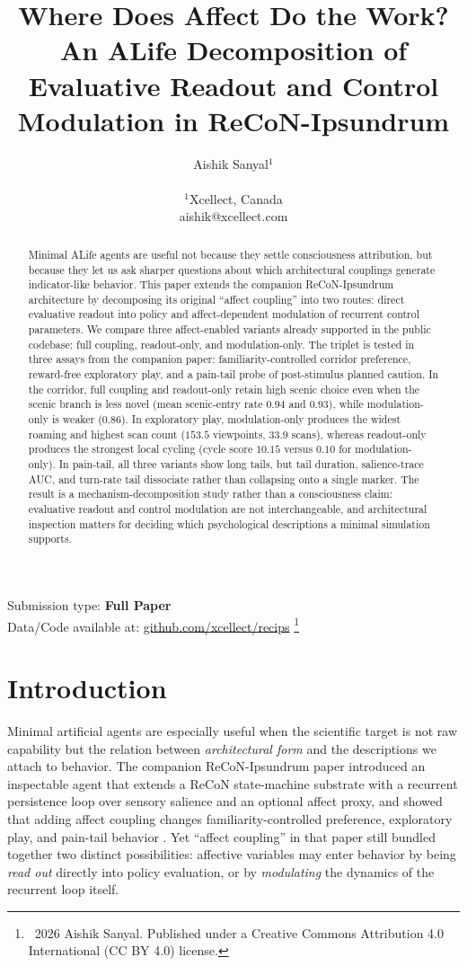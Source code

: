 \documentclass[letterpaper]{article}
\title{Where Does Affect Do the Work?\\
An ALife Decomposition of Evaluative Readout and Control Modulation in ReCoN-Ipsundrum}
\author{
    Aishik Sanyal$^{1}$ \\
    \mbox{}\\
    $^{1}$Xcellect, Canada \\
    aishik@xcellect.com
}
\newcommand\blfootnote[1]{%
  \begingroup
  \renewcommand\thefootnote{}\footnote{#1}%
  \addtocounter{footnote}{-1}%
  \endgroup
}
\begin{document}
\maketitle

\begin{abstract}
Minimal ALife agents are useful not because they settle consciousness attribution, but because they let us ask sharper questions about which architectural couplings generate indicator-like behavior. This paper extends the companion ReCoN-Ipsundrum architecture by decomposing its original ``affect coupling'' into two routes: direct evaluative readout into policy and affect-dependent modulation of recurrent control parameters. We compare three affect-enabled variants already supported in the public codebase: full coupling, readout-only, and modulation-only. The triplet is tested in three assays from the companion paper: familiarity-controlled corridor preference, reward-free exploratory play, and a pain-tail probe of post-stimulus planned caution. In the corridor, full coupling and readout-only retain high scenic choice even when the scenic branch is less novel (mean scenic-entry rate $0.94$ and $0.93$), while modulation-only is weaker ($0.86$). In exploratory play, modulation-only produces the widest roaming and highest scan count ($153.5$ viewpoints, $33.9$ scans), whereas readout-only produces the strongest local cycling (cycle score $10.15$ versus $0.10$ for modulation-only). In pain-tail, all three variants show long tails, but tail duration, salience-trace AUC, and turn-rate tail dissociate rather than collapsing onto a single marker. The result is a mechanism-decomposition study rather than a consciousness claim: evaluative readout and control modulation are not interchangeable, and architectural inspection matters for deciding which psychological descriptions a minimal simulation supports.
\end{abstract}

Submission type: \textbf{Full Paper}\\
Data/Code available at: \href{https://github.com/xcellect/recips}{github.com/xcellect/recips}
\blfootnote{\textcopyright~2026 Aishik Sanyal. Published under a Creative Commons Attribution 4.0 International (CC BY 4.0) license.}

\section{Introduction}
Minimal artificial agents are especially useful when the scientific target is not raw capability but the relation between \emph{architectural form} and the descriptions we attach to behavior. The companion ReCoN-Ipsundrum paper introduced an inspectable agent that extends a ReCoN state-machine substrate with a recurrent persistence loop over sensory salience and an optional affect proxy, and showed that adding affect coupling changes familiarity-controlled preference, exploratory play, and pain-tail behavior \citep{Sanyal2026ReCoNIpsundrum}. Yet ``affect coupling'' in that paper still bundled together two distinct possibilities: affective variables may enter behavior by being \emph{read out} directly into policy evaluation, or by \emph{modulating} the dynamics of the recurrent loop itself.
\end{document}
